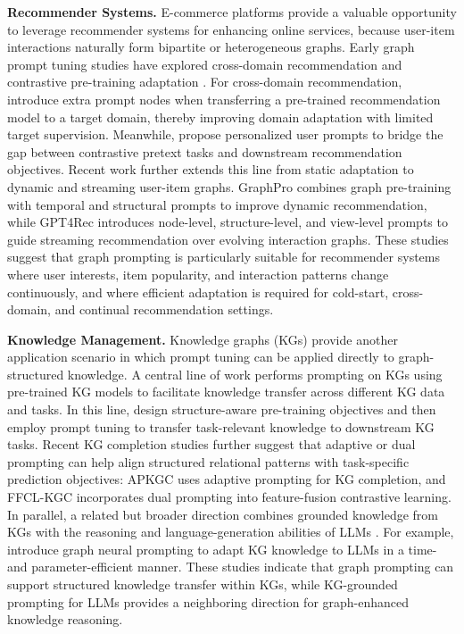 \textbf{Recommender Systems. }
E-commerce platforms provide a valuable opportunity to leverage recommender systems for enhancing online services, because user-item interactions naturally form bipartite or heterogeneous graphs. Early graph prompt tuning studies have explored cross-domain recommendation and contrastive pre-training adaptation \cite{wu2023personalized, hao2024motifbased}. For cross-domain recommendation, \citet{yi2023contrastive} introduce extra prompt nodes when transferring a pre-trained recommendation model to a target domain, thereby improving domain adaptation with limited target supervision. Meanwhile, \citet{yang2023empirical} propose personalized user prompts to bridge the gap between contrastive pretext tasks \cite{wu2021selfsupervised, yu2022are} and downstream recommendation objectives. Recent work further extends this line from static adaptation to dynamic and streaming user-item graphs. GraphPro \cite{yang2024graphpro} combines graph pre-training with temporal and structural prompts to improve dynamic recommendation, while GPT4Rec \cite{zhang2024gpt4rec} introduces node-level, structure-level, and view-level prompts to guide streaming recommendation over evolving interaction graphs. These studies suggest that graph prompting is particularly suitable for recommender systems where user interests, item popularity, and interaction patterns change continuously, and where efficient adaptation is required for cold-start, cross-domain, and continual recommendation settings.



\textbf{Knowledge Management. }Knowledge graphs (KGs) provide another application scenario in which prompt tuning can be applied directly to graph-structured knowledge. A central line of work performs prompting on KGs using pre-trained KG models to facilitate knowledge transfer across different KG data and tasks. In this line, \citet{zhang2023structure} design structure-aware pre-training objectives and then employ prompt tuning to transfer task-relevant knowledge to downstream KG tasks. Recent KG completion studies further suggest that adaptive or dual prompting can help align structured relational patterns with task-specific prediction objectives: APKGC \cite{maoliniyazi2026apkgc} uses adaptive prompting for KG completion, and FFCL-KGC \cite{zhu2026ffclkgc} incorporates dual prompting into feature-fusion contrastive learning. In parallel, a related but broader direction combines grounded knowledge from KGs with the reasoning and language-generation abilities of LLMs \cite{wang2023knowledge, robinson2023leveraging, park2023graphguided, zhang2023benchmarking, pan2023unifying}. For example, \citet{tian2023graph} introduce graph neural prompting to adapt KG knowledge to LLMs in a time- and parameter-efficient manner. These studies indicate that graph prompting can support structured knowledge transfer within KGs, while KG-grounded prompting for LLMs provides a neighboring direction for graph-enhanced knowledge reasoning.





